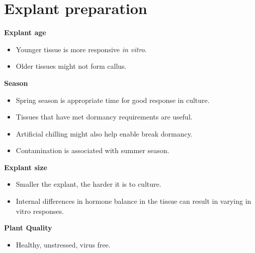 \documentclass[
  ignorenonframetext,
  aspectratio=169]{beamer}
\providecommand{\tightlist}{%
  \setlength{\itemsep}{0pt}\setlength{\parskip}{0pt}}
\begin{document}
\hypertarget{explant-preparation}{%
\section{Explant preparation}\label{explant-preparation}}

\begin{frame}{}
\protect\hypertarget{section-9}{}
\textbf{Explant age}

\begin{itemize}
\tightlist
\item
  Younger tissue is more responsive \emph{in vitro}.
\item
  Older tissues might not form callus.
\end{itemize}

\textbf{Season}

\begin{itemize}
\tightlist
\item
  Spring season is appropriate time for good response in culture.
\item
  Tissues that have met dormancy requirements are useful.
\item
  Artificial chilling might also help enable break dormancy.
\item
  Contamination is associated with summer season.
\end{itemize}
\end{frame}

\begin{frame}{}
\protect\hypertarget{section-10}{}
\textbf{Explant size}

\begin{itemize}
\tightlist
\item
  Smaller the explant, the harder it is to culture.
\item
  Internal differences in hormone balance in the tissue can result in
  varying in vitro responses.
\end{itemize}

\textbf{Plant Quality}

\begin{itemize}
\tightlist
\item
  Healthy, unstressed, virus free.
\end{itemize}
\end{frame}
\end{document}
